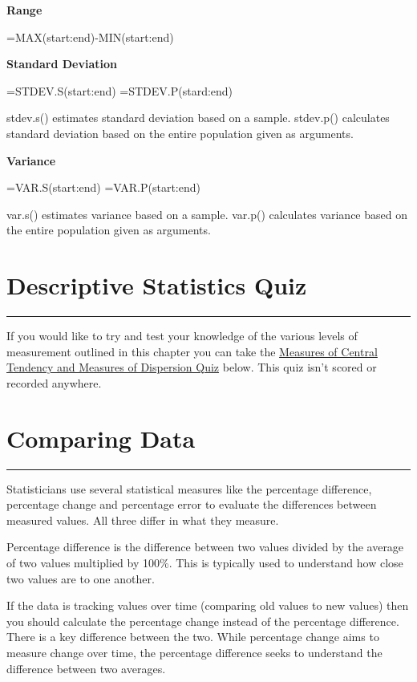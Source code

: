 \documentclass[
]{book}
\begin{document}
\textbf{Range}

=MAX(start:end)-MIN(start:end)

\textbf{Standard Deviation}

=STDEV.S(start:end)
=STDEV.P(stard:end)

stdev.s() estimates standard deviation based on a sample. stdev.p() calculates standard deviation based on the entire population given as arguments.

\textbf{Variance}

=VAR.S(start:end)
=VAR.P(start:end)

var.s() estimates variance based on a sample. var.p() calculates variance based on the entire population given as arguments.

\hypertarget{descriptive-statistics-quiz}{%
\chapter{Descriptive Statistics Quiz}\label{descriptive-statistics-quiz}}

\begin{center}\rule{0.5\linewidth}{0.5pt}\end{center}

If you would like to try and test your knowledge of the various levels of measurement outlined in this chapter you can take the \href{https://view.genial.ly/628a683cb8b7d200114d12a0/presentation-quiz-on-measures}{Measures of Central Tendency and Measures of Dispersion Quiz} below. This quiz isn't scored or recorded anywhere.

\hypertarget{comparing-data}{%
\chapter{Comparing Data}\label{comparing-data}}

\begin{center}\rule{0.5\linewidth}{0.5pt}\end{center}

Statisticians use several statistical measures like the percentage difference, percentage change and percentage error to evaluate the differences between measured values. All three differ in what they measure.

Percentage difference is the difference between two values divided by the average of two values multiplied by 100\%. This is typically used to understand how close two values are to one another.

If the data is tracking values over time (comparing old values to new values) then you should calculate the percentage change instead of the percentage difference. There is a key difference between the two. While percentage change aims to measure change over time, the percentage difference seeks to understand the difference between two averages.
\end{document}
